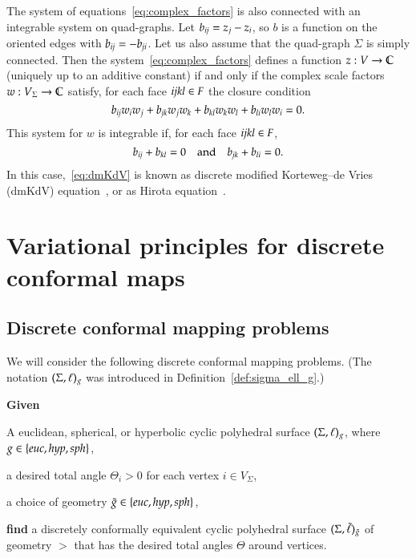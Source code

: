 \documentclass[Thesis]{subfiles}
\begin{document}
\begin{remark}
  The system of equations~\eqref{eq:complex_factors} is also connected
  with an integrable system on quad-graphs. Let $b_{\it
    ij}=z_{j}-z_{i}$, so $b$ is a function on the oriented edges with
  $b_{\it ij}=-b_{\it ji}$. Let us also assume that the quad-graph
  $\Sigma$ is simply connected. Then the
  system~\eqref{eq:complex_factors} defines a function
  $z:V\rightarrow\mathbb C$ (uniquely up to an additive constant) if and only
  if the complex scale factors $w:V_{\Sigma}\rightarrow \mathbb C$ satisfy,
  for each face ${\it ijkl}\in F$ the closure condition
  \begin{equation}
    \label{eq:dmKdV}
    b_{\it ij}w_{i}w_{j}+b_{\it jk}w_{j}w_{k}+b_{\it kl}w_{k}w_{l}+b_{\it li}w_{l}w_{i}=0.
  \end{equation}
  This system for $w$ is integrable if, for each face ${\it ijkl}\in
  F$,
  \begin{equation*}
    b_{\it ij}+b_{\it kl}=0 \quad\text{and}\quad b_{\it jk}+b_{\it
      li}=0.
  \end{equation*}
  In this case,~\eqref{eq:dmKdV} is known as discrete modified
  Korteweg--de Vries (dmKdV) equation~\cite{NijhoffCapel1995}, or as
  Hirota equation~\cite{Bobenko-Suris2002, BobenkoSuris2008}.
\end{remark}



\section{Variational principles for discrete conformal maps}
\label{sec:vari-princ}

\subsection{Discrete conformal mapping problems}

We will consider the following discrete conformal mapping
problems. (The notation $(\Sigma,\ell)_{g}$ was introduced in
Definition~\ref{def:sigma_ell_g}.)

\begin{problem}
\label{prob:total_angles}
\textbf{Given}
\begin{compactitem}
\item A euclidean, spherical, or hyperbolic cyclic polyhedral surface
  $(\Sigma,\ell)_{g}$, where $\g\in\{\euc, \hyp, \sph\}$,
\item a desired total angle $\Theta_{i}>0$ for each vertex $i\in V_{\Sigma}$,
\item a choice of geometry $\gt\in\{\euc, \hyp, \sph\}$,
\end{compactitem}
\noindent%
\textbf{find} %
a discretely conformally equivalent cyclic polyhedral surface
$(\Sigma,\tilde{\ell})_{\tilde{g}}$ of geometry $\gt$ that has the
desired total angles $\Theta$ around vertices.
\end{problem}
\end{document}
